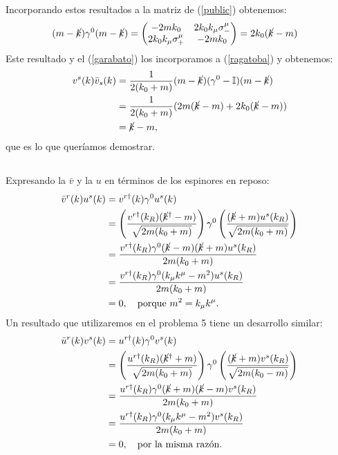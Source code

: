 Incorporando estos resultados a la matriz de (\ref{public}) obtenemos:
\begin{equation}\begin{split}
(m-\cancel k)\gamma^0(m-\cancel k)
&=
\begin{pmatrix}
-2mk_0&2k_0k_\mu\sigma_-^\mu\\
2k_0k_\mu\sigma_+^\mu&-2mk_0
\end{pmatrix}=2k_0(\cancel k-m)
\end{split}\end{equation}
Este resultado y el (\ref{garabato}) los incorporamos a (\ref{ragatoba}) y obtenemos:
\begin{equation}\begin{split}
v^s(k)\bar v_s(k)
&=\frac1{2(k_0+m)}(m-\cancel k)(\gamma^0-\mathbb I)(m-\cancel k)\\
&=\frac1{2(k_0+m)}(2m (\cancel k-m) + 2k_0(\cancel k-m))\\
&=\cancel k-m,
\end{split}\end{equation}
que es lo que queríamos demostrar.
\subsection{}
Expresando la $\bar v$ y la $u$ en términos de los espinores en reposo:
\begin{equation}\begin{split}
\bar v^r(k)u^s(k)
&=v^{r\dagger}(k)\gamma^0u^s(k)\\
&=\left(
\frac{
v^{r\dagger}(k_R)(\cancel k^\dagger-m)
}{
\sqrt{2m(k_0+m)}
}
\right)
\gamma^0
\left(
\frac{
(\cancel k+m)u^s(k_R)
}{
\sqrt{2m(k_0+m)}
}
\right)\\
&=\frac{v^{r\dagger}(k_R)\gamma^0(\cancel k-m)(\cancel k+m)u^s(k_R)}{2m(k_0+m)}\\
&=\frac{v^{r\dagger}(k_R)\gamma^0(k_\mu k^\mu -m^2)u^s(k_R)}{2m(k_0+m)}\\
&=0,\quad\text{porque $m^2=k_\mu k^\mu$.}
\end{split}\end{equation}
Un resultado que utilizaremos en el problema 5 tiene un desarrollo similar:
\begin{equation}\begin{split}
\bar u^r(k)v^s(k)
&=u^{r\dagger}(k)\gamma^0v^s(k)\\
&=\left(
\frac{
u^{r\dagger}(k_R)(\cancel k^\dagger+m)
}{
\sqrt{2m(k_0+m)}
}
\right)
\gamma^0
\left(
\frac{
(\cancel k+m)v^s(k_R)
}{
\sqrt{2m(k_0-m)}
}
\right)\\
&=\frac{u^{r\dagger}(k_R)\gamma^0(\cancel k+m)(\cancel k-m)v^s(k_R)}{2m(k_0+m)}\\
&=\frac{u^{r\dagger}(k_R)\gamma^0(k_\mu k^\mu -m^2)v^s(k_R)}{2m(k_0+m)}\\
&=0,\quad\text{por la misma razón.}
\end{split}\end{equation}
